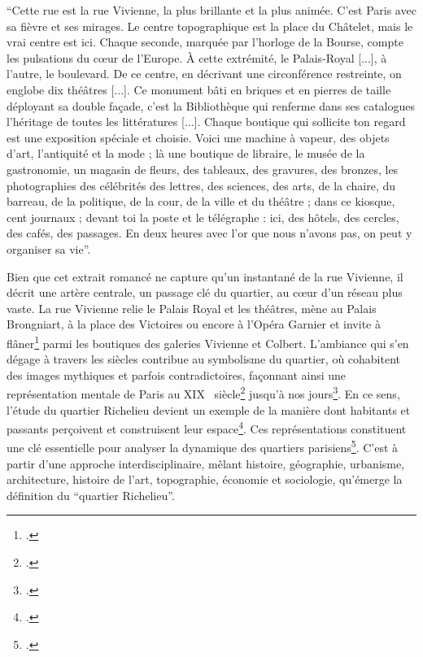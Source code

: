 \begin{displayquote}\enquote{Cette rue est la rue Vivienne, la plus brillante et la plus animée. C'est Paris avec sa fièvre et ses mirages. Le centre topographique est la place du Châtelet, mais le vrai centre est ici. Chaque seconde, marquée par l'horloge de la Bourse, compte les pulsations du cœur de l'Europe. À cette extrémité, le Palais-Royal [...], à l'autre, le boulevard. De ce centre, en décrivant une circonférence restreinte, on englobe dix théâtres [...]. Ce monument bâti en briques et en pierres de taille déployant sa double façade, c'est la Bibliothèque qui renferme dans ses catalogues l'héritage de toutes les littératures [...]. Chaque boutique qui sollicite ton regard est une exposition spéciale et choisie. Voici une machine à vapeur, des objets d'art, l'antiquité et la mode ; là une boutique de libraire, le musée de la gastronomie, un magasin de fleurs, des tableaux, des gravures, des bronzes, les photographies des célébrités des lettres, des sciences, des arts, de la chaire, du barreau, de la politique, de la cour, de la ville et du théâtre ; dans ce kiosque, cent journaux ; devant toi la poste et le télégraphe : ici, des hôtels, des cercles, des cafés, des passages. En deux heures avec l'or que nous n'avons pas, on peut y organiser sa vie}.
\end{displayquote}

Bien que cet extrait romancé ne capture qu'un instantané de la rue Vivienne, il décrit une artère centrale, un passage clé du quartier, au cœur d'un réseau plus vaste. La rue Vivienne relie le Palais Royal et les théâtres, mène au Palais Brongniart, à la place des Victoires ou encore à l'Opéra Garnier et invite à flâner\footcite{WALTERParis1989} parmi les boutiques des galeries Vivienne et Colbert. L'ambiance qui s'en dégage à travers les siècles contribue au symbolisme du quartier, où cohabitent des images mythiques et parfois contradictoires, façonnant ainsi une représentation mentale de Paris au XIX\ieme~  siècle\footcite{CHOAYPour2009} jusqu'à nos jours\footcite{SAWYERCartographie2011}. En ce sens, l'étude du quartier Richelieu devient un exemple de la manière dont habitants et passants perçoivent et construisent leur espace\footcite{LEFEBVREproduction1974}. Ces représentations constituent une clé essentielle pour analyser la dynamique des quartiers parisiens\footcite{DUVETTECulture2024}. C'est à partir d'une approche interdisciplinaire, mêlant histoire, géographie, urbanisme, architecture, histoire de l'art, topographie, économie et sociologie, qu'émerge la définition du \enquote{quartier Richelieu}.

